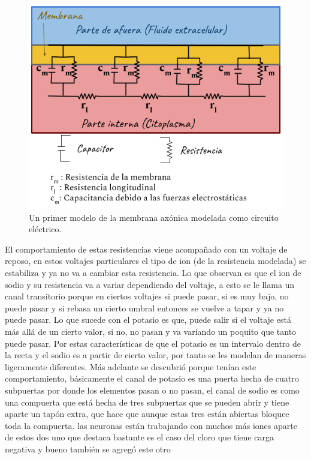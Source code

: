 \begin{figure}[h]
 \centering
 \includegraphics[scale=0.5]{../Figuras/ModeloHH.2}
 \caption{Un primer modelo de la membrana axónica modelada como circuito eléctrico.}
 \label{fig:ModelHh}
\end{figure}

El comportamiento de estas resistencias viene acompañado con un voltaje de reposo, en estos voltajes particulares el tipo de ion (de la resistencia modelada) se estabiliza y ya no va a cambiar esta resistencia. 
Lo que observan es que el ion de sodio y su resistencia va a variar dependiendo del voltaje, a esto se le llama un canal transitorio porque en ciertos voltajes si puede pasar, si es muy bajo, no puede pasar y si rebasa un cierto umbral entonces se vuelve a tapar y ya no puede pasar. 
Lo que sucede con el potasio es que, puede salir si el voltaje está más allá de un cierto valor, si no, no pasan y va variando un poquito que tanto puede pasar. Por estas características de que el potasio es un intervalo dentro de la recta y el sodio es a partir de cierto valor, por tanto se les modelan de maneras ligeramente diferentes. Más adelante se descubrió porque tenían este comportamiento, básicamente el canal de potasio es una puerta hecha de cuatro subpuertas por donde los elementos pasan o no pasan, el canal de sodio es como una compuerta que está hecha de tres subpuertas que se pueden abrir y tiene aparte un tapón extra, que hace que  aunque estas tres están abiertas bloquee toda la compuerta.
 las neuronas están trabajando con muchos más iones aparte de estos dos uno que destaca bastante es el caso del cloro que tiene carga negativa y bueno también se agregó este otro 
 
